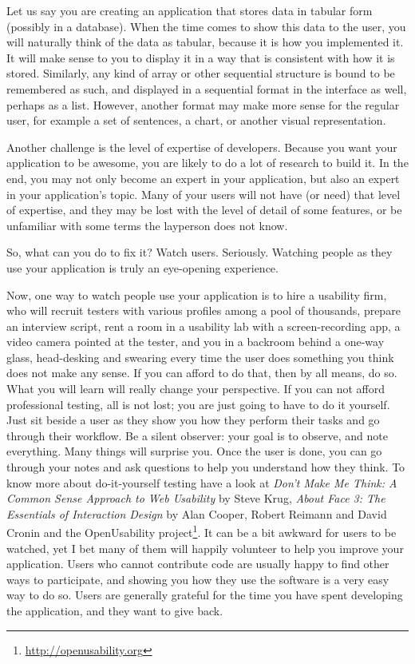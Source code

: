 Let us say you are creating an application that stores data in tabular form
(possibly in a database). When the time comes to show this data to the user, you
will naturally think of the data as tabular, because it is how you implemented
it. It will make sense to you to display it in a way that is consistent with how
it is stored. Similarly, any kind of array or other sequential structure is
bound to be remembered as such, and displayed in a sequential format in the
interface as well, perhaps as a list. However, another format may make more
sense for the regular user, for example a set of sentences, a chart, or another
visual representation.

Another challenge is the level of expertise of developers. Because you want your
application to be awesome, you are likely to do a lot of research to build it.
In the end, you may not only become an expert in your application, but also an
expert in your application's topic. Many of your users will not have (or need)
that level of expertise, and they may be lost with the level of detail of some
features, or be unfamiliar with some terms the layperson does not know.

So, what can you do to fix it? Watch users. Seriously. Watching people as they
use your application is truly an eye-opening experience.

Now, one way to watch people use your application is to hire a usability firm,
who will recruit testers with various profiles among a pool of thousands,
prepare an interview script, rent a room in a usability lab with a
screen-recording app, a video camera pointed at the tester, and you in a
backroom behind a one-way glass, head-desking and swearing every time the user
does something you think does not make any sense. If you can afford to do that,
then by all means, do so. What you will learn will really change your
perspective. If you can not afford professional testing, all is not lost; you
are just going to have to do it yourself. Just sit beside a user as they show
you how they perform their tasks and go through their workflow. Be a silent
observer: your goal is to observe, and note everything. Many things will
surprise you. Once the user is done, you can go through your notes and ask
questions to help you understand how they think. To know more about
do-it-yourself testing have a look at \textit{Don't Make Me Think: A Common
Sense Approach to Web Usability} by Steve Krug, \textit{About Face 3: The
Essentials of Interaction Design} by Alan Cooper, Robert Reimann and David
Cronin and the OpenUsability project\footnote{\url{http://openusability.org}}.
It can be a bit awkward for users to be watched, yet I bet many of them will
happily volunteer to help you improve your application. Users who cannot
contribute code are usually happy to find other ways to participate, and showing
you how they use the software is a very easy way to do so. Users are generally
grateful for the time you have spent developing the application, and they want
to give back.


